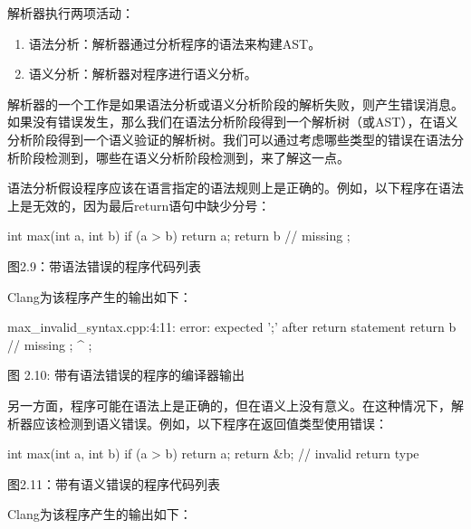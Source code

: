 
解析器执行两项活动：

\begin{enumerate}
\item
语法分析：解析器通过分析程序的语法来构建AST。

\item
语义分析：解析器对程序进行语义分析。
\end{enumerate}

解析器的一个工作是如果语法分析或语义分析阶段的解析失败，则产生错误消息。如果没有错误发生，那么我们在语法分析阶段得到一个解析树（或AST），在语义分析阶段得到一个语义验证的解析树。我们可以通过考虑哪些类型的错误在语法分析阶段检测到，哪些在语义分析阶段检测到，来了解这一点。

语法分析假设程序应该在语言指定的语法规则上是正确的。例如，以下程序在语法上是无效的，因为最后return语句中缺少分号：

\begin{cpp}
int max(int a, int b) {
  if (a > b)
    return a;
  return b // missing ;
}
\end{cpp}

\begin{center}
图2.9：带语法错误的程序代码列表
\end{center}

Clang为该程序产生的输出如下：

\begin{shell}
max_invalid_syntax.cpp:4:11: error: expected ';' after return statement
  return b // missing ;
          ^
          ;
\end{shell}

\begin{center}
图 2.10: 带有语法错误的程序的编译器输出
\end{center}

另一方面，程序可能在语法上是正确的，但在语义上没有意义。在这种情况下，解析器应该检测到语义错误。例如，以下程序在返回值类型使用错误：

\begin{cpp}
int max(int a, int b) {
  if (a > b)
    return a;
  return &b; // invalid return type
}
\end{cpp}

\begin{center}
图2.11：带有语义错误的程序代码列表
\end{center}

Clang为该程序产生的输出如下：

